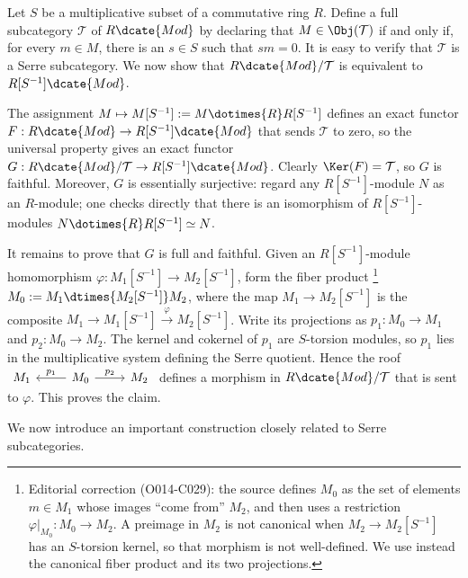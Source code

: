 \begin{example}
Let $S$ be a multiplicative subset of a commutative ring $R$. Define a full
subcategory $\mathcal{T}$ of $R\dcate{Mod}$ by declaring that
$M\in\Obj(\mathcal{T})$ if and only if, for every $m\in M$, there is an
$s\in S$ such that $sm=0$. It is easy to verify that $\mathcal{T}$ is a Serre
subcategory. We now show that $R\dcate{Mod}/\mathcal{T}$ is equivalent to
$R[S^{-1}]\dcate{Mod}$.

The assignment $M\mapsto M[S^{-1}]:=M\dotimes{R}R[S^{-1}]$ defines an exact
functor $F:R\dcate{Mod}\to R[S^{-1}]\dcate{Mod}$ that sends $\mathcal{T}$ to
zero, so the universal property gives an exact functor
$G:R\dcate{Mod}/\mathcal{T}\to R[S^{-1}]\dcate{Mod}$. Clearly
$\Ker(F)=\mathcal{T}$, so $G$ is faithful. Moreover, $G$ is essentially
surjective: regard any $R[S^{-1}]$-module $N$ as an $R$-module; one checks
directly that there is an isomorphism of $R[S^{-1}]$-modules
$N\dotimes{R}R[S^{-1}]\simeq N$.

It remains to prove that $G$ is full and faithful. Given an
$R[S^{-1}]$-module homomorphism
$\varphi:M_1[S^{-1}]\to M_2[S^{-1}]$, form the fiber product
\footnote{Editorial correction (O014-C029): the source defines $M_0$ as the
set of elements $m\in M_1$ whose images ``come from'' $M_2$, and then uses a
restriction $\varphi|_{M_0}:M_0\to M_2$. A preimage in $M_2$ is not canonical
when $M_2\to M_2[S^{-1}]$ has an $S$-torsion kernel, so that morphism is not
well-defined. We use instead the canonical fiber product and its two
projections.}
$M_0:=M_1\dtimes{M_2[S^{-1}]}M_2$, where the map
$M_1\to M_2[S^{-1}]$ is the composite
$M_1\to M_1[S^{-1}]\xrightarrow{\varphi}M_2[S^{-1}]$.
Write its projections as $p_1:M_0\to M_1$ and $p_2:M_0\to M_2$. The kernel
and cokernel of $p_1$ are $S$-torsion modules, so $p_1$ lies in the
multiplicative system defining the Serre quotient. Hence the roof
$\begin{tikzcd}
	M_1 & M_0 \arrow[l, "p_1"'] \arrow[r, "p_2"] & M_2
\end{tikzcd}$
defines a morphism in $R\dcate{Mod}/\mathcal{T}$ that is sent to $\varphi$.
This proves the claim.
\end{example}

We now introduce an important construction closely related to Serre
subcategories.

